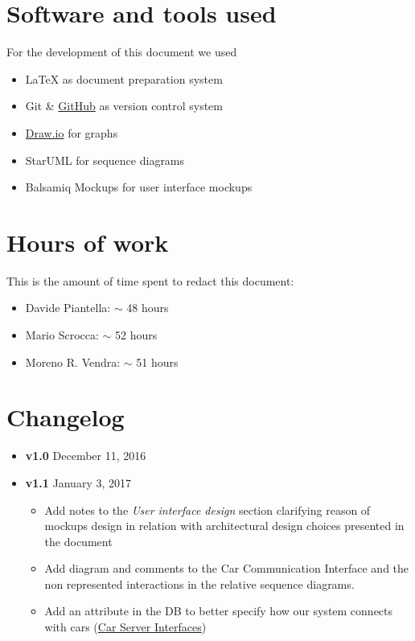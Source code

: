 \begin{appendices}

	\section{Software and tools used}
	For the development of this document we used
	\begin{itemize}
		\item \LaTeX{} as document preparation system
		\item Git \& \href{http://github.com}{GitHub} as version control system
		\item \href{http://draw.io}{Draw.io} for graphs 
		\item StarUML for sequence diagrams
		\item Balsamiq Mockups for user interface mockups
	\end{itemize}
	
	\section{Hours of work}
	This is the amount of time spent to redact this document:
	\begin{itemize}
		\item Davide Piantella: $\sim$ 48 hours
		\item Mario Scrocca: $\sim$ 52 hours
		\item Moreno R. Vendra: $\sim$ 51 hours
	\end{itemize}
	
		\section{Changelog}
	\begin{itemize}
		\item \textbf{v1.0} December 11, 2016
		\item \textbf{v1.1} January 3, 2017
		\begin{itemize}
			\item Add notes to the \emph{User interface design} section clarifying reason of mockups design in relation with architectural design choices presented in the document
			\item Add diagram and comments to the Car Communication Interface and the non represented interactions in the relative sequence diagrams.
			\item Add an attribute in the DB to better specify how our system connects with cars (\hyperref[sec:carServerInt]{Car Server Interfaces})
			
		\end{itemize}
	\end{itemize}
	
\end{appendices}


